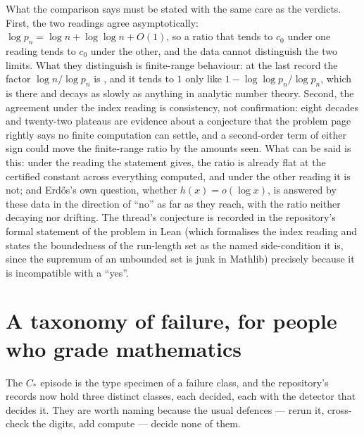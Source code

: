 \documentclass[11pt]{article}
\theoremstyle{definition}\newtheorem{observation}{Observation}
\newcommand{\Cstar}{C_{*}}
\begin{document}
What the comparison says must be stated with the same care as the verdicts. First, the two readings agree asymptotically: $\log p_n=\log n+\log\log n+O(1)$, so a ratio that tends to $c_0$ under one reading tends to $c_0$ under the other, and the data cannot distinguish the two limits. What they distinguish is finite-range behaviour: at the last record the factor $\log n/\log p_n$ is \LogRatioLast, and it tends to $1$ only like $1-\log\log p_n/\log p_n$, which is \LogLogOverLogLast{} there and decays as slowly as anything in analytic number theory. Second, the agreement under the index reading is consistency, not confirmation: eight decades and twenty-two plateaus are evidence about a conjecture that the problem page rightly says no finite computation can settle, and a second-order term of either sign could move the finite-range ratio by the amounts seen. What can be said is this: under the reading the statement gives, the ratio is already flat at the certified constant across everything computed, and under the other reading it is not; and Erd\H{o}s's own question, whether $h(x)=o(\log x)$, is answered by these data in the direction of ``no'' as far as they reach, with the ratio neither decaying nor drifting. The thread's conjecture is recorded in the repository's formal statement of the problem in Lean (which formalises the index reading and states the boundedness of the run-length set as the named side-condition it is, since the supremum of an unbounded set is junk in Mathlib) precisely because it is incompatible with a ``yes''.

\section{A taxonomy of failure, for people who grade mathematics}\label{sec:taxonomy}

The $\Cstar$ episode is the type specimen of a failure class, and the repository's records now hold three distinct classes, each decided, each with the detector that decides it. They are worth naming because the usual defences --- rerun it, cross-check the digits, add compute --- decide none of them.
\end{document}
